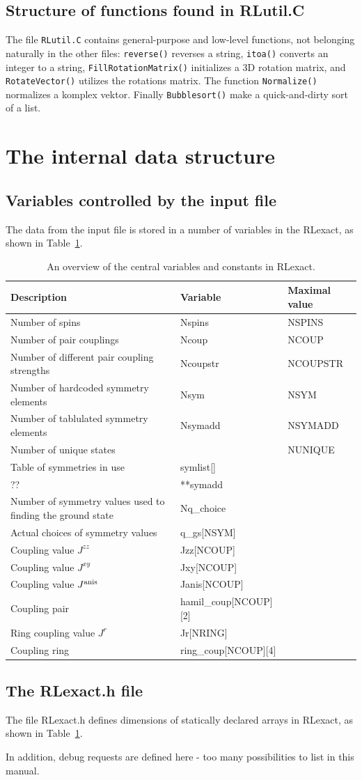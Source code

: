 \documentclass{article}
\begin{document}
\subsection{Structure of functions found in RLutil.C}
The file \verb+RLutil.C+ contains general-purpose and low-level functions, not belonging naturally in the other files:
\verb+reverse()+ reverses a string, \verb+itoa()+ converts an integer to a string, \verb+FillRotationMatrix()+ initializes a 3D rotation matrix, and \verb+RotateVector()+ utilizes the rotations matrix. The function \verb+Normalize()+ normalizes a komplex vektor. Finally \verb+Bubblesort()+ make a quick-and-dirty sort of a list.


\newpage
\section{The internal data structure}
\subsection{Variables controlled by the input file}
The data from the input file is stored in a number of variables in the RLexact, as shown in 
Table~\ref{tab:variables}.

\begin{table}
\begin{tabular}{|l|l|l|} \hline
Description & Variable & Maximal value \\
\hline
Number of spins & Nspins & NSPINS \\
Number of pair couplings & Ncoup & NCOUP \\
Number of different pair coupling strengths & Ncoupstr & NCOUPSTR \\
Number of hardcoded symmetry elements & Nsym & NSYM \\
Number of tablulated symmetry elements & Nsymadd & NSYMADD \\
Number of unique states & & NUNIQUE \\
Table of symmetries in use & symlist[] & \\
?? & **symadd & \\
Number of symmetry values used to finding the ground state & Nq\_choice & \\
Actual choices of symmetry values & q\_gs[NSYM] & \\
Coupling value $J^{zz}$ & Jzz[NCOUP] & \\
Coupling value $J^{xy}$ & Jxy[NCOUP] & \\
Coupling value $J^{\rm anis}$ & Janis[NCOUP] & \\
Coupling pair & hamil\_coup[NCOUP][2] & \\
Ring coupling value $J^{r}$ & Jr[NRING] & \\
Coupling ring & ring\_coup[NCOUP][4] & \\
\hline
\end{tabular}
\caption{An overview of the central variables and constants in RLexact.} \label{tab:variables}
\end{table}

\subsection{The RLexact.h file} \label{sect:RLexact.h}
The file RLexact.h defines dimensions of statically declared arrays in RLexact, as shown
in Table~\ref{tab:variables}. 

In addition, debug requests are defined here - too many possibilities to list in this manual.
\end{document}
